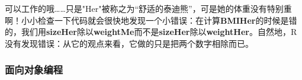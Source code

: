 \documentclass[12pt,a4paper]{article}\usepackage{graphicx, color}
\begin{document}
可以工作的哦……只是"Her"被称之为“舒适的泰迪熊”，可是她的体重没有特别重啊！小小检查一下代码就会很快地发现一个小错误：在计算\textbf{BMIHer}的时候是错的，我们用\textbf{sizeHer}除以\textbf{weightMe}而不是\textbf{sizeHer}除以\textbf{weightHer}。自然地，R没有发现错误：从它的观点来看，它做的只是把两个数字相除而已。

\subsubsection{面向对象编程}
\end{document}
